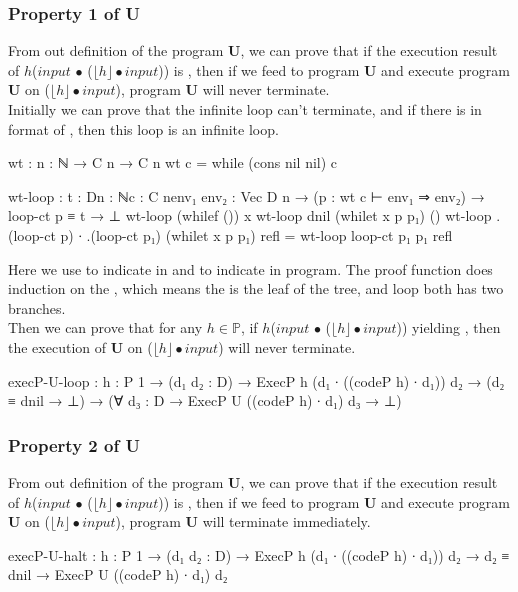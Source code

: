 \subsubsection{Property 1 of U}
From out definition of the program \textbf{U}, we can prove that if the execution result of $h$($input$ $\bullet$ ($\lfloor h\rfloor \bullet input$)) is ,
then if we feed  to program \textbf{U} and execute program \textbf{U} on ($\lfloor h\rfloor \bullet input$), program \textbf{U} will never terminate.\\
Initially we can prove that the infinite loop can't terminate, and if there is  in format of , then this  loop is an infinite loop.
\begin{code}
wt : {n : ℕ} → C n → C n
wt c = while (cons nil nil) c

wt-loop : {t : D}{n : ℕ}{c : C n}{env₁ env₂ : Vec D n} 
	  → (p : wt c ⊢ env₁ ⇒ env₂) → loop-ct p ≡ t → ⊥
wt-loop (whilef ()) x
wt-loop {dnil} (whilet x p p₁) ()
wt-loop {.(loop-ct p) ∙ .(loop-ct p₁)} (whilet x p p₁) refl 
	= wt-loop {loop-ct p₁} p₁ refl
\end{code}
Here we use  to indicate  in \WHILE and  to indicate  in \WHILE program.
The proof function does induction on the , which means the  is the leaf of the tree,  and  loop both has two branches.\\
Then we can prove that for any $h \in \mathds{P}$, if $h$($input$ $\bullet$ ($\lfloor h\rfloor \bullet input$)) yielding , then the execution of \textbf{U} on ($\lfloor h\rfloor \bullet input$) will never terminate.
\begin{code}
execP-U-loop :  {h : P 1} → (d₁ d₂ : D)
             → ExecP h (d₁ ∙ ((codeP h) ∙ d₁)) d₂
             → (d₂ ≡ dnil → ⊥)
             → (∀ {d₃ : D} → ExecP U ((codeP h) ∙ d₁) d₃ → ⊥)
\end{code}
\subsubsection{Property 2 of U}
From out definition of the program \textbf{U}, we can prove that if the execution result of $h$($input$ $\bullet$ ($\lfloor h\rfloor \bullet input$)) is ,
then if we feed  to program \textbf{U} and execute program \textbf{U} on ($\lfloor h\rfloor \bullet input$), program \textbf{U} will terminate immediately.
\begin{code}
execP-U-halt :  {h : P 1} → (d₁ d₂ : D)
             → ExecP h (d₁ ∙ ((codeP h) ∙ d₁)) d₂
             → d₂ ≡ dnil
             → ExecP U ((codeP h) ∙ d₁) d₂
\end{code}
